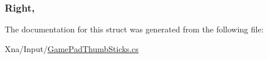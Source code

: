 \subsubsection[{Right}]{ Right\hspace{0.3cm}{\ttfamily [get]}, {\ttfamily [set]}}\label{structMicrosoft_1_1Xna_1_1Framework_1_1Input_1_1GamePadThumbSticks_a2ae7939e5be5847d0103c617395fa0ab}


The documentation for this struct was generated from the following file\+:\begin{DoxyCompactItemize}
\item 
Xna/\+Input/\hyperlink{GamePadThumbSticks_8cs}{Game\+Pad\+Thumb\+Sticks.\+cs}\end{DoxyCompactItemize}
